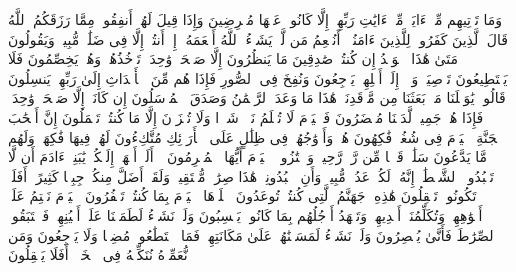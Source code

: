 \startbuffer[\q:36:46]
وَمَا تَأۡتِیهِم مِّنۡ ءَایَةࣲ مِّنۡ ءَایَٰتِ رَبِّهِمۡ إِلَّا كَانُوا۟ عَنۡهَا مُعۡرِضِینَ%
\stopbuffer
\startbuffer[\q:36:47]
وَإِذَا قِیلَ لَهُمۡ أَنفِقُوا۟ مِمَّا رَزَقَكُمُ ٱللَّهُ قَالَ ٱلَّذِینَ كَفَرُوا۟ لِلَّذِینَ ءَامَنُوۤا۟ أَنُطۡعِمُ مَن لَّوۡ یَشَاۤءُ ٱللَّهُ أَطۡعَمَهُۥۤ إِنۡ أَنتُمۡ إِلَّا فِی ضَلَٰلࣲ مُّبِینࣲ%
\stopbuffer
\startbuffer[\q:36:48]
وَیَقُولُونَ مَتَىٰ هَٰذَا ٱلۡوَعۡدُ إِن كُنتُمۡ صَٰدِقِینَ%
\stopbuffer
\startbuffer[\q:36:49]
مَا یَنظُرُونَ إِلَّا صَیۡحَةࣰ وَٰحِدَةࣰ تَأۡخُذُهُمۡ وَهُمۡ یَخِصِّمُونَ%
\stopbuffer
\startbuffer[\q:36:50]
فَلَا یَسۡتَطِیعُونَ تَوۡصِیَةࣰ وَلَاۤ إِلَىٰۤ أَهۡلِهِمۡ یَرۡجِعُونَ%
\stopbuffer
\startbuffer[\q:36:51]
وَنُفِخَ فِی ٱلصُّورِ فَإِذَا هُم مِّنَ ٱلۡأَجۡدَاثِ إِلَىٰ رَبِّهِمۡ یَنسِلُونَ%
\stopbuffer
\startbuffer[\q:36:52]
قَالُوا۟ یَٰوَیۡلَنَا مَنۢ بَعَثَنَا مِن مَّرۡقَدِنَاۜۗ هَٰذَا مَا وَعَدَ ٱلرَّحۡمَٰنُ وَصَدَقَ ٱلۡمُرۡسَلُونَ%
\stopbuffer
\startbuffer[\q:36:53]
إِن كَانَتۡ إِلَّا صَیۡحَةࣰ وَٰحِدَةࣰ فَإِذَا هُمۡ جَمِیعࣱ لَّدَیۡنَا مُحۡضَرُونَ%
\stopbuffer
\startbuffer[\q:36:54]
فَٱلۡیَوۡمَ لَا تُظۡلَمُ نَفۡسࣱ شَیۡءࣰا وَلَا تُجۡزَوۡنَ إِلَّا مَا كُنتُمۡ تَعۡمَلُونَ%
\stopbuffer
\startbuffer[\q:36:55]
إِنَّ أَصۡحَٰبَ ٱلۡجَنَّةِ ٱلۡیَوۡمَ فِی شُغُلࣲ فَٰكِهُونَ%
\stopbuffer
\startbuffer[\q:36:56]
هُمۡ وَأَزۡوَٰجُهُمۡ فِی ظِلَٰلٍ عَلَى ٱلۡأَرَاۤئِكِ مُتَّكِءُونَ%
\stopbuffer
\startbuffer[\q:36:57]
لَهُمۡ فِیهَا فَٰكِهَةࣱ وَلَهُم مَّا یَدَّعُونَ%
\stopbuffer
\startbuffer[\q:36:58]
سَلَٰمࣱ قَوۡلࣰا مِّن رَّبࣲّ رَّحِیمࣲ%
\stopbuffer
\startbuffer[\q:36:59]
وَٱمۡتَٰزُوا۟ ٱلۡیَوۡمَ أَیُّهَا ٱلۡمُجۡرِمُونَ%
\stopbuffer
\startbuffer[\q:36:60]
۞ أَلَمۡ أَعۡهَدۡ إِلَیۡكُمۡ یَٰبَنِیۤ ءَادَمَ أَن لَّا تَعۡبُدُوا۟ ٱلشَّیۡطَٰنَۖ إِنَّهُۥ لَكُمۡ عَدُوࣱّ مُّبِینࣱ%
\stopbuffer
\startbuffer[\q:36:61]
وَأَنِ ٱعۡبُدُونِیۚ هَٰذَا صِرَٰطࣱ مُّسۡتَقِیمࣱ%
\stopbuffer
\startbuffer[\q:36:62]
وَلَقَدۡ أَضَلَّ مِنكُمۡ جِبِلࣰّا كَثِیرًاۖ أَفَلَمۡ تَكُونُوا۟ تَعۡقِلُونَ%
\stopbuffer
\startbuffer[\q:36:63]
هَٰذِهِۦ جَهَنَّمُ ٱلَّتِی كُنتُمۡ تُوعَدُونَ%
\stopbuffer
\startbuffer[\q:36:64]
ٱصۡلَوۡهَا ٱلۡیَوۡمَ بِمَا كُنتُمۡ تَكۡفُرُونَ%
\stopbuffer
\startbuffer[\q:36:65]
ٱلۡیَوۡمَ نَخۡتِمُ عَلَىٰۤ أَفۡوَٰهِهِمۡ وَتُكَلِّمُنَاۤ أَیۡدِیهِمۡ وَتَشۡهَدُ أَرۡجُلُهُم بِمَا كَانُوا۟ یَكۡسِبُونَ%
\stopbuffer
\startbuffer[\q:36:66]
وَلَوۡ نَشَاۤءُ لَطَمَسۡنَا عَلَىٰۤ أَعۡیُنِهِمۡ فَٱسۡتَبَقُوا۟ ٱلصِّرَٰطَ فَأَنَّىٰ یُبۡصِرُونَ%
\stopbuffer
\startbuffer[\q:36:67]
وَلَوۡ نَشَاۤءُ لَمَسَخۡنَٰهُمۡ عَلَىٰ مَكَانَتِهِمۡ فَمَا ٱسۡتَطَٰعُوا۟ مُضِیࣰّا وَلَا یَرۡجِعُونَ%
\stopbuffer
\startbuffer[\q:36:68]
وَمَن نُّعَمِّرۡهُ نُنَكِّسۡهُ فِی ٱلۡخَلۡقِۚ أَفَلَا یَعۡقِلُونَ%
